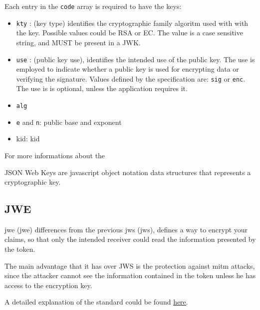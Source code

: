 Each entry in the \texttt{code} array is required to have the keys:
\begin{itemize}
    \item \texttt{kty} : (key type) identifies the cryptographic family algoritm
        used with with the key. Possible values could be RSA or EC.
        The value is a case sensitive string, and MUST be present in a JWK.
    \item \texttt{use} : (public key use), identifies the intended use of the
        public key. The use is employed to indicate whether a public key is used
        for encrypting data or verifying the signature. Values defined by the
        specification are: \texttt{sig} or \texttt{enc}.
        The use is is optional, unless the application requires it.
    \item \texttt{alg}
    \item \texttt{e} and \texttt{n}: public base and exponent
    \item \acs{kid}: \acl{kid}
\end{itemize}

For more informations about the

JSON Web Keys are javascript object notation data structures that represents a
cryptographic key.

\subsection{JWE}
\acs{jwe} (\acl{jwe}) differences from the previous \acs{jws} (\acl{jws}),
defines a way to encrypt your claims, so that only the intended
receiver could read the information presented by the token.

The main advantage that it has over JWS is the protection against \acs{mitm} attacks,
since the attacker cannot see the information contained in the token unless he
has access to the encryption key.

A detailed explanation of the standard could be found
\href{https://tools.ietf.org/html/draft-ietf-jose-json-web-signature-41}{here}.


